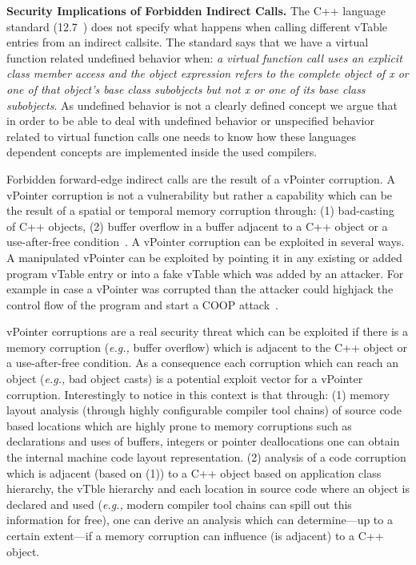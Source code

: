 \textbf{Security Implications of Forbidden Indirect Calls.}
\label{Security Implications of Forbidden Forward Indirect Calls}
The C++ language standard (12.7~\cite{iso:iecN3690}) does not specify
what happens when calling different vTable entries from an indirect callsite.
The standard says that we have a virtual function related undefined behavior when:
\textit{a virtual function call uses an explicit class member access and the object expression refers to the complete
object of x or one of that object’s base class subobjects but not x or one of its base class subobjects}.
As undefined behavior is not a clearly defined concept we argue that in order to be able to deal
with undefined behavior or  unspecified behavior related to virtual function calls one needs to know
how these languages dependent concepts are implemented inside the used compilers.

Forbidden forward-edge indirect calls are the result of a vPointer corruption.
A vPointer corruption is not a vulnerability but rather a capability which 
can be the result of a spatial or temporal memory corruption through: 
(1) bad-casting~\cite{byoungyoung:typecasting} of C++ objects, 
(2) buffer overflow in a buffer adjacent to a C++ object or a use-after-free condition~\cite{schuster:coop}.
A vPointer corruption can be exploited in several ways. A manipulated vPointer
can be exploited by pointing it in any existing or added program vTable entry 
or into a fake vTable which was added by an attacker. For example in case a vPointer
was corrupted than the attacker could highjack the control flow of the program 
and start a COOP attack~\cite{schuster:coop}.

vPointer corruptions are a real security threat which can be exploited if there 
is a memory corruption (\textit{e.g.,} buffer overflow) which is adjacent to
the C++ object or a use-after-free condition. As a consequence each corruption 
which can reach an object (\textit{e.g.,} bad object casts) is a potential exploit vector 
for a vPointer corruption. Interestingly to notice in this context is that through:
(1) memory layout analysis (through highly configurable compiler tool chains) of 
source code based locations which are highly prone to
memory corruptions such as declarations and uses of buffers, integers or pointer 
deallocations one can obtain the internal machine code layout representation.
(2) analysis of a code corruption which is adjacent (based on (1)) to a C++ object based on
application class hierarchy, the vTble hierarchy and each location in source code where an object
is declared and used (\textit{e.g.,} modern compiler tool chains can spill out this information for free), 
one can derive an analysis which can determine---up to a certain extent---if a memory corruption 
can influence (is adjacent) to a C++ object.

